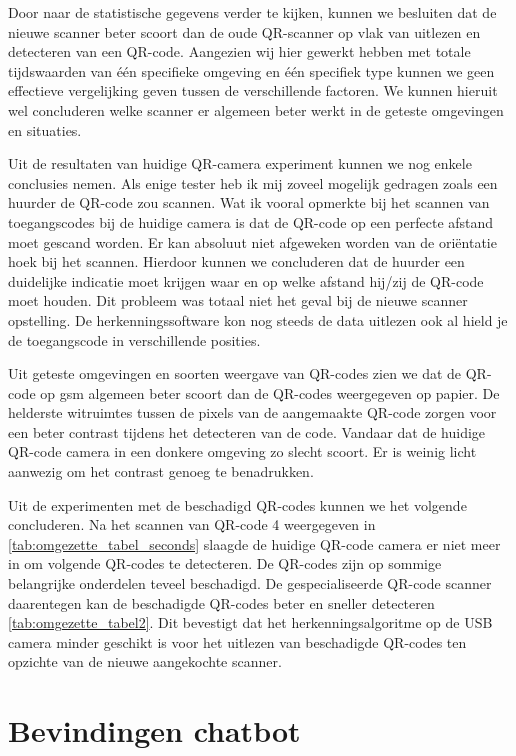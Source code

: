     
Door naar de statistische gegevens verder te kijken, kunnen we besluiten dat de nieuwe scanner beter scoort dan de oude QR-scanner op vlak van uitlezen en detecteren van een QR-code. Aangezien wij hier gewerkt hebben met totale tijdswaarden van één specifieke omgeving en één specifiek type kunnen we geen effectieve vergelijking geven tussen de verschillende factoren. We kunnen hieruit wel concluderen welke scanner er algemeen beter werkt in de geteste omgevingen en situaties.

Uit de resultaten van huidige QR-camera experiment kunnen we nog enkele conclusies nemen. Als enige tester heb ik mij zoveel mogelijk gedragen zoals een huurder de QR-code zou scannen. Wat ik vooral opmerkte bij het scannen van toegangscodes bij de huidige camera is dat de QR-code op een perfecte afstand moet gescand worden. Er kan absoluut niet afgeweken worden van de oriëntatie hoek bij het scannen. Hierdoor kunnen we concluderen dat de huurder een duidelijke indicatie moet krijgen waar en op welke afstand hij/zij de QR-code moet houden. Dit probleem was totaal niet het geval bij de nieuwe scanner opstelling. De herkenningssoftware kon nog steeds de data uitlezen ook al hield je de toegangscode in verschillende posities.

Uit geteste omgevingen en soorten weergave van QR-codes zien we dat de QR-code op gsm algemeen beter scoort dan de QR-codes weergegeven op papier. De helderste witruimtes tussen de pixels van de aangemaakte QR-code zorgen voor een beter contrast tijdens het detecteren van de code. Vandaar dat de huidige QR-code camera in een donkere omgeving zo slecht scoort. Er is weinig licht aanwezig om het contrast genoeg te benadrukken. 

Uit de experimenten met de beschadigd QR-codes kunnen we het volgende concluderen. Na het scannen van QR-code 4 weergegeven in \ref{tab:omgezette_tabel_seconds} slaagde de huidige QR-code camera er niet meer in om volgende QR-codes te detecteren. De QR-codes zijn op sommige belangrijke onderdelen teveel beschadigd. De gespecialiseerde QR-code scanner daarentegen kan de beschadigde QR-codes beter en sneller detecteren \ref{tab:omgezette_tabel2}. Dit bevestigt dat het herkenningsalgoritme op de USB camera minder geschikt is voor het uitlezen van beschadigde QR-codes ten opzichte van de nieuwe aangekochte scanner.
\newpage
\section{Bevindingen  chatbot}
\label{sec:resultatenChatbot}

